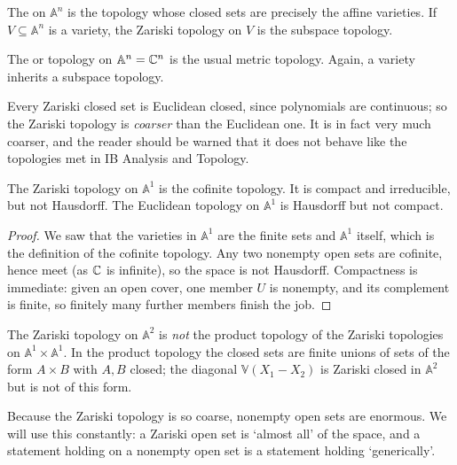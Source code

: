 \documentclass[a4paper]{scrartcl}
\newcommand{\A}{\mathbb{A}}
\newcommand{\V}{\mathbb{V}}
\begin{document}
\begin{definition}
	The  on $\A^n$ is the topology whose closed sets are precisely the affine varieties. If $V \subseteq \A^n$ is a variety, the Zariski topology on $V$ is the subspace topology.
\end{definition}

\begin{definition}
	The  or  topology on $\A^n = \C^n$ is the usual metric topology. Again, a variety inherits a subspace topology.
\end{definition}

Every Zariski closed set is Euclidean closed, since polynomials are continuous; so the Zariski topology is \emph{coarser} than the Euclidean one. It is in fact very much coarser, and the reader should be warned that it does not behave like the topologies met in IB Analysis and Topology.

\begin{proposition}
	The Zariski topology on $\A^1$ is the cofinite topology. It is compact and irreducible, but not Hausdorff. The Euclidean topology on $\A^1$ is Hausdorff but not compact.
\end{proposition}

\begin{proof}
	We saw that the varieties in $\A^1$ are the finite sets and $\A^1$ itself, which is the definition of the cofinite topology. Any two nonempty open sets are cofinite, hence meet (as $\mathbb{C}$ is infinite), so the space is not Hausdorff. Compactness is immediate: given an open cover, one member $U$ is nonempty, and its complement is finite, so finitely many further members finish the job.
\end{proof}

\begin{remark}
	The Zariski topology on $\A^2$ is \emph{not} the product topology of the Zariski topologies on $\A^1 \times \A^1$. In the product topology the closed sets are finite unions of sets of the form $A \times B$ with $A, B$ closed; the diagonal $\V(X_1 - X_2)$ is Zariski closed in $\A^2$ but is not of this form.
\end{remark}

Because the Zariski topology is so coarse, nonempty open sets are enormous. We will use this constantly: a Zariski open set is `almost all' of the space, and a statement holding on a nonempty open set is a statement holding `generically'.
\end{document}
